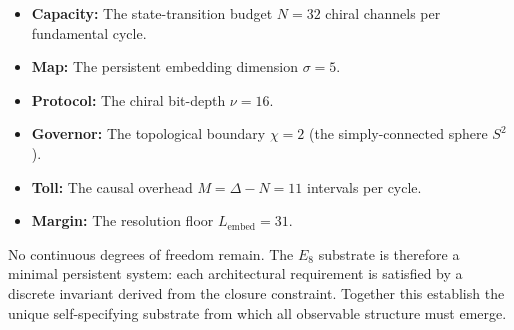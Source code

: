 \begin{itemize}
    \item \textbf{Capacity:} The state-transition budget $N=32$ chiral channels per fundamental cycle.
    \item \textbf{Map:} The persistent embedding dimension $\sigma=5$.
    \item \textbf{Protocol:} The chiral bit-depth $\nu=16$.
    \item \textbf{Governor:} The topological boundary $\chi=2$ (the simply-connected sphere $S^2$).
    \item \textbf{Toll:} The causal overhead $M=\Delta-N=11$ intervals per cycle.
    \item \textbf{Margin:} The resolution floor $L_{\text{embed}}=31$.
\end{itemize}

No continuous degrees of freedom remain. The $E_8$ substrate is therefore a minimal persistent system: each architectural requirement is satisfied by a discrete invariant derived from the closure constraint. Together this establish the unique self-specifying substrate from which all observable structure must emerge.